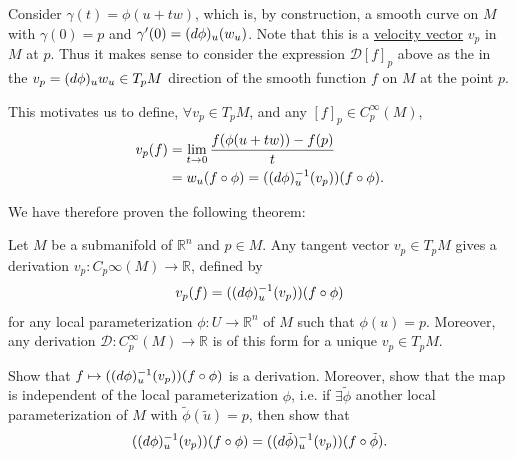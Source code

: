 \documentclass[notoc,notitlepage]{tufte-book}
\begin{document}
Consider $\gamma(t) = \phi( u + tw )$, which is, by construction, a smooth curve
on $M$ with $\gamma(0) = p$ and $\gamma'(0) = (\mathop{}\!d{\phi})_u(w_u)$. Note that
this is a \hyperref[defn:velocity_vectors_on_a_submanifold]{velocity vector}
$v_p$ in $M$ at $p$. Thus it makes sense to consider the expression
$\mathcal{D}[f]_p$ above as the  in the $v_p =
(\mathop{}\!d{\phi})_u w_u \in T_p M$ direction of the smooth function $f$ on $M$ at the
point $p$.

This motivates us to define, $\forall v_p \in T_p M$, and any $[f]_p \in
C_p^\infty(M)$,
\begin{align}
  v_p(f) &= \lim_{t \to 0} \frac{f(\phi(u + tw)) - f(p)}{t} \nonumber \\
         &= w_u (f \circ \phi) = ((\mathop{}\!d{\phi})_u^{-1}(v_p))(f \circ \phi).
         \label{eq:defining_dir_deri_on_subman}
\end{align}

We have therefore proven the following theorem:

\begin{thm}\label{thm:derivations_are_tangent_vectors_even_on_submanifolds}
  Let $M$ be a submanifold of $\mathbb{R}^n$ and $p \in M$. Any tangent vector
  $v_p \in T_p M$ gives a derivation $v_p : C_p\infty(M) \to \mathbb{R}$,
  defined by
  \begin{equation*}
    v_p(f) = ((\mathop{}\!d{\phi})_u^{-1} (v_p)) (f \circ \phi)
  \end{equation*}
  for any local parameterization $\phi : U \to \mathbb{R}^n$ of $M$ such that
  $\phi(u) = p$. Moreover, any derivation $\mathcal{D} : C_p^\infty(M) \to
  \mathbb{R}$ is of this form for a unique $v_p \in T_p M$.
\end{thm}

\begin{ex}
  Show that $f \mapsto ((\mathop{}\!d{\phi})_u^{-1} (v_p))(f \circ \phi)$ is a
  derivation. Moreover, show that the map is independent of the local
  parameterization $\phi$, i.e. if $\exists \tilde{\phi}$ another local
  parameterization of $M$ with $\tilde{\phi}(\tilde{u}) = p$, then show that
  \begin{equation*}
    ((\mathop{}\!d{\phi})_u^{-1} (v_p)) (f \circ \phi)
    = ((\mathop{}\!d{\tilde{\phi}})_u^{-1} (v_p))(f \circ \tilde{\phi}).
  \end{equation*}
\end{ex}

\end{document}
